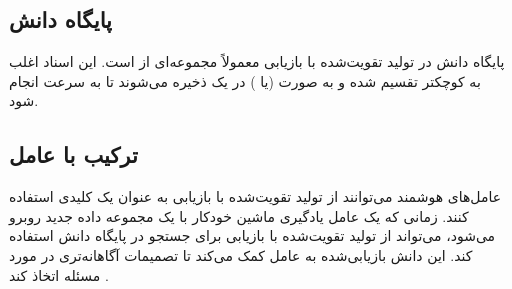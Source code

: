 \subsection{پایگاه دانش}
پایگاه دانش در تولید تقویت‌شده با بازیابی معمولاً مجموعه‌ای از  است. این اسناد اغلب به  کوچکتر تقسیم شده و به صورت  (یا ) در یک  ذخیره می‌شوند تا  به سرعت انجام شود.

\subsection{ترکیب با عامل}
عامل‌های هوشمند می‌توانند از تولید تقویت‌شده با بازیابی به عنوان یک  کلیدی استفاده کنند. زمانی که یک عامل یادگیری ماشین خودکار با یک مجموعه داده جدید روبرو می‌شود، می‌تواند از تولید تقویت‌شده با بازیابی برای جستجو در پایگاه دانش استفاده کند. این دانش بازیابی‌شده به عامل کمک می‌کند تا تصمیمات آگاهانه‌تری در مورد مسئله اتخاذ کند \cite{singh2025agenticrag}.

